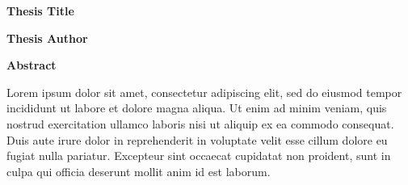 


\begin{center}
    \textbf{Thesis Title}
    
    \vspace{0.4cm}
    
    \vspace{0.4cm}
    \textbf{Thesis Author}
    
    \vspace{0.9cm}
    \textbf{Abstract}
    
\end{center}

Lorem ipsum dolor sit amet, consectetur adipiscing elit, sed do eiusmod tempor incididunt ut labore et dolore magna aliqua. Ut enim ad minim veniam, quis nostrud exercitation ullamco laboris nisi ut aliquip ex ea commodo consequat. Duis aute irure dolor in reprehenderit in voluptate velit esse cillum dolore eu fugiat nulla pariatur. Excepteur sint occaecat cupidatat non proident, sunt in culpa qui officia deserunt mollit anim id est laborum.